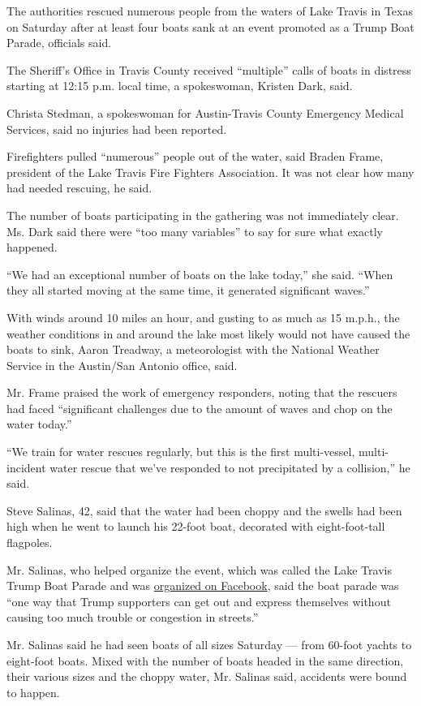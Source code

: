 The authorities rescued numerous people from the waters of Lake Travis
in Texas on Saturday after at least four boats sank at an event promoted
as a Trump Boat Parade, officials said.

The Sheriff's Office in Travis County received ``multiple'' calls of
boats in distress starting at 12:15 p.m. local time, a spokeswoman,
Kristen Dark, said.

Christa Stedman, a spokeswoman for Austin-Travis County Emergency
Medical Services, said no injuries had been reported.

Firefighters pulled ``numerous'' people out of the water, said Braden
Frame, president of the Lake Travis Fire Fighters Association. It was
not clear how many had needed rescuing, he said.

The number of boats participating in the gathering was not immediately
clear. Ms. Dark said there were ``too many variables'' to say for sure
what exactly happened.

``We had an exceptional number of boats on the lake today,'' she said.
``When they all started moving at the same time, it generated
significant waves.''

With winds around 10 miles an hour, and gusting to as much as 15 m.p.h.,
the weather conditions in and around the lake most likely would not have
caused the boats to sink, Aaron Treadway, a meteorologist with the
National Weather Service in the Austin/San Antonio office, said.

Mr. Frame praised the work of emergency responders, noting that the
rescuers had faced ``significant challenges due to the amount of waves
and chop on the water today.''

``We train for water rescues regularly, but this is the first
multi-vessel, multi-incident water rescue that we've responded to not
precipitated by a collision,'' he said.

Steve Salinas, 42, said that the water had been choppy and the swells
had been high when he went to launch his 22-foot boat, decorated with
eight-foot-tall flagpoles.

Mr. Salinas, who helped organize the event, which was called the Lake
Travis Trump Boat Parade and was
\href{https://www.facebookcorewwwi.onion/events/3308504859200726/?active_tab=about}{organized
on Facebook}, said the boat parade was ``one way that Trump supporters
can get out and express themselves without causing too much trouble or
congestion in streets.''

Mr. Salinas said he had seen boats of all sizes Saturday --- from
60-foot yachts to eight-foot boats. Mixed with the number of boats
headed in the same direction, their various sizes and the choppy water,
Mr. Salinas said, accidents were bound to happen.

